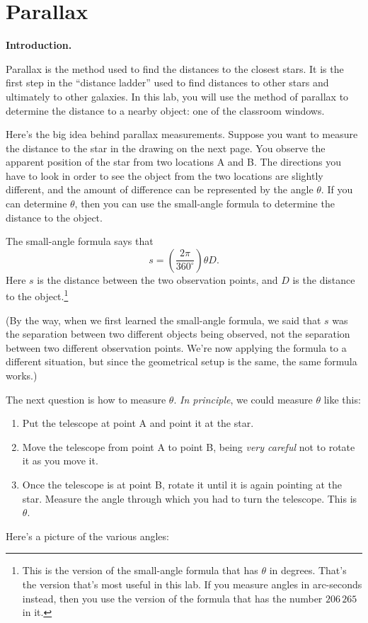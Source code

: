 \section{Parallax}

\makelabheader

{\bf Introduction.}

Parallax is the method used to find the distances to the closest
stars.  It is the first step in the ``distance ladder'' used to find
distances to other stars and ultimately to other galaxies.  In this
lab, you will use the method of parallax to determine the distance to a
nearby object: one of the classroom windows.

Here's the big idea behind parallax measurements.  Suppose you want
to measure the distance to the star in the drawing on the next page.  
You observe
the apparent position of the star from two locations A and B.  The directions
you have to look in order to see the object from the two locations
are slightly different, and the amount of difference can be represented
by the angle $\theta$.  If you can determine $\theta$, then you can
use the small-angle formula to determine the distance to the object.

The small-angle formula says that
$$
s = \left(\frac{2\pi}{360^\circ}\right)\theta D.
$$
Here $s$ is the distance between the two observation points, and 
$D$ is the distance to the object.\footnote{This is the version 
of the small-angle formula that has $\theta$ in degrees.  That's
the version that's most useful in this lab.  If you measure angles
in arc-seconds instead, then you use the version of the
formula that has the number $206\,265$ in it.}

(By the way, when we first learned the small-angle formula, we said
that $s$ was the separation between two different objects being
observed, not the separation between two different observation points.
We're now applying the formula to a different situation, but since the
geometrical setup is the same, the same formula works.)

The next question is how to measure $\theta$.  {\it In principle}, we could
measure $\theta$ like this:
\begin{enumerate}
\item Put the telescope at point A and point it at the star.
\item Move the telescope from point A to point B, being {\it very careful}
not to rotate it as you move it.
\item Once the telescope is at point B, rotate it until it is again pointing
at the star.  Measure the angle through which you had to turn the
telescope.  This is $\theta$.
\end{enumerate}
Here's a picture of the various angles:

